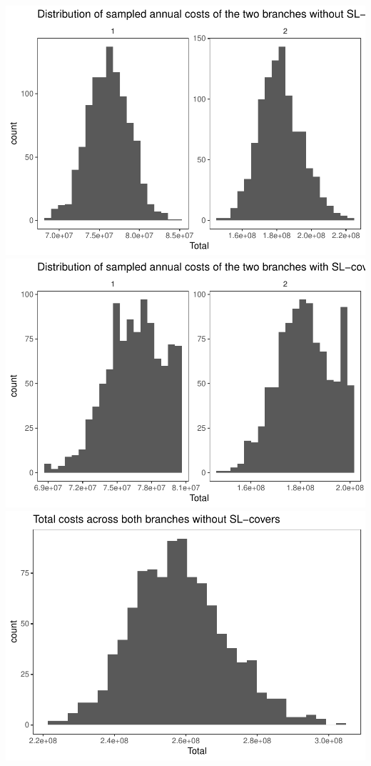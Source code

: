 \documentclass[]{article}
\begin{document}
\includegraphics{Projekt1_files/figure-latex/unnamed-chunk-16-1.pdf}
\includegraphics{Projekt1_files/figure-latex/unnamed-chunk-16-2.pdf}
\includegraphics{Projekt1_files/figure-latex/unnamed-chunk-16-3.pdf}
\end{document}
